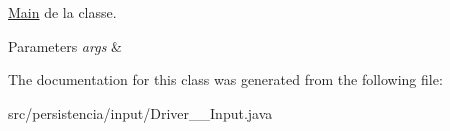 \hyperlink{classMain}{Main} de la classe. 


\begin{DoxyParams}{Parameters}
{\em args} & \\
\hline
\end{DoxyParams}


The documentation for this class was generated from the following file\+:\begin{DoxyCompactItemize}
\item 
src/persistencia/input/Driver\+\_\+\+\_\+\+Input.\+java\end{DoxyCompactItemize}
